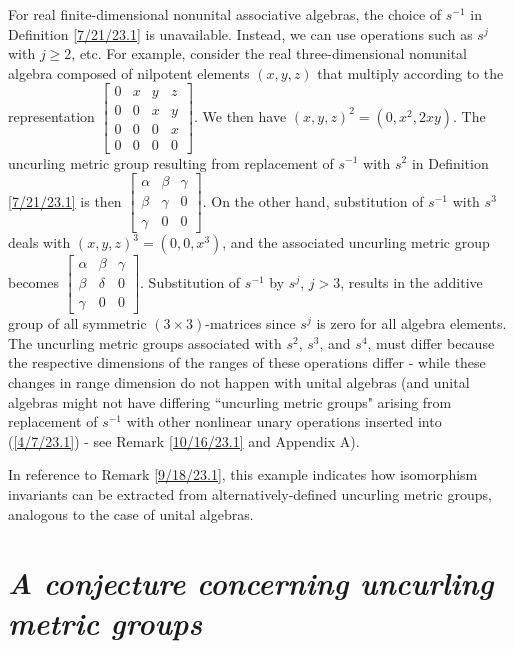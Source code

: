 \documentclass{amsart}
\numberwithin{equation}{section}
\theoremstyle{definition}
\numberwithin{theorem}{section}
\begin{document}
For real finite-dimensional nonunital associative algebras, the choice of $s^{-1}$ in Definition \ref{7/21/23.1} is unavailable.  Instead, we can use operations such as $s^j$ with $j\ge 2$, etc.   For example, consider the real three-dimensional nonunital algebra composed of nilpotent elements $(x,y,z)$ that multiply according to the representation
  $ \left[
\begin{array}{ccccc}
0 & x & y & z  \\
0 & 0 & x & y \\
0 & 0 & 0 & x \\
0 & 0 & 0 & 0
\end{array}
\right] $.  We then have $(x,y,z)^2 = (0,x^2, 2xy)$.  The uncurling metric group resulting from replacement of $s^{-1}$ with  $s^2$ in Definition \ref{7/21/23.1} is then $\left[
\begin{array}{ccccc}
\alpha & \beta & \gamma   \\
\beta & \gamma & 0 \\
\gamma & 0 & 0  
\end{array}
\right] $.  On the other hand, substitution of $s^{-1}$ with $s^3$  deals with $(x,y,z)^3 = (0,0, x^3)$, and the associated uncurling metric group becomes $\left[
\begin{array}{ccccc}
\alpha & \beta & \gamma   \\
\beta & \delta & 0 \\
\gamma & 0 & 0  
\end{array}
\right] $.  Substitution of $s^{-1}$ by $s^j$, $j>3$, results in the additive group of all symmetric $(3\times 3)$-matrices since $s^j$ is zero for all algebra elements.  The uncurling metric groups associated with $s^2$, $s^3$, and $s^4$, must differ because the respective dimensions of the ranges of these operations differ - while these changes in range dimension do not happen with unital algebras (and unital algebras might not have differing ``uncurling metric groups" arising from replacement of $s^{-1}$ with other nonlinear unary operations inserted into (\ref{4/7/23.1}) - see Remark \ref{10/16/23.1} and Appendix A).

In reference to Remark \ref{9/18/23.1}, this example indicates how isomorphism invariants can be extracted from alternatively-defined uncurling metric groups, analogous to the case of unital algebras. 

\bigskip


\appendix

\section{\it A conjecture concerning uncurling metric groups}
\end{document}
